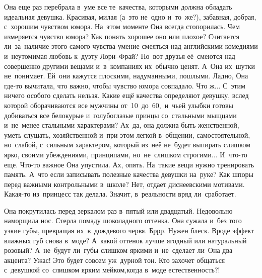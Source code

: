 
\lettrine[lines=3, loversize=0.1]{О}{}на еще раз перебрала в~уме все те~качества, которыми должна обладать идеальная девушка.
Красивая, милая (а~это не~одно и~то~же?), забавная, добрая, с~хорошим чувством юмора.
На~этом моменте Она всегда стопорилась.
Чем измеряется чувство юмора? Как понять хорошее оно или плохое? Считается ли~за~наличие этого самого чувства умение смеяться над английскими комедиями и~неутомимая любовь к~дуэту Лори--Фрай? Но~вот друзья её~смеются над совершенно другими вещами и~в~компаниях их~обычно ценят.
А~Она их~шутки не~понимает.
Ей~они кажутся плоскими, надуманными, пошлыми.
Ладно, Она где-то вычитала, что важно, чтобы чувство юмора совпадало.
Что ж...
С~этим ничего особого сделать нельзя.
Какие ещё качества определяют девушку, вслед которой оборачиваются все мужчины от~10~до~60,~и~чьей улыбки готовы добиваться все белокурые и~голубоглазые принцы со~стальными мыщцами и~не~менее стальными характерами? Ах~да, она должна быть женственной, уметь слушать, хозяйственной и~при этом легкой в~общении, самостоятельной, но~слабой, с~сильным характером, который из~неё не~будет выпирать слишком ярко, своими убеждениями, принципами, но~не~слишком строгими...
И~что-то еще.
Что-то важное Она упустила.
Ах, опять.
На~такие вещи нужно тренировать память.
А~что если записывать полезные качества девушки на~руке? Как шпоры перед важными контрольными в~школе? Нет, отдает диснеевскими мотивами.
Какая-то из~принцесс так делала.
Значит, в~реальности вряд ли~сработает.

Она покрутилась перед зеркалом раз в~пятый или двадцатый.
Недовольно наморщила нос.
Стерла помаду шоколадного оттенка.
Она сужала и~без того узкие губы, превращая их~в~дождевого червя.
Бррр.
Нужен блеск.
Вроде эффект влажных губ снова в~моде? 
А~какой оттенок лучше ягодный или натуральный розовый? 
А~не~будут ли~губы слишком яркими и~не~сделает ли~Она два акцента? 
Ужас! 
Это будет совсем уж~дурной тон.
Кто захочет общаться с~девушкой со~слишком ярким мейком,когда в~моде естественность?!

